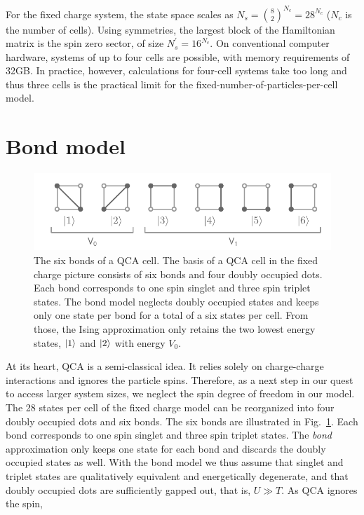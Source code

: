 For the fixed charge system, the state space scales as $N_s =
\binom{8}{2}^{N_c} = 28^{N_c}$ ($N_c$ is the number of cells). Using symmetries,
the largest block of the Hamiltonian matrix is the spin zero sector, of size
$N_s^{\prime} = 16^{N_c}$. On conventional computer hardware, systems of up to
four cells are possible, with memory requirements of 32GB. In practice,
however, calculations for four-cell systems take too long and thus three
cells is the practical limit for the fixed-number-of-particles-per-cell
model.


\section{Bond model}

%
\begin{figure}
  \center
  \includegraphics{bond}
  \caption{
  The six bonds of a QCA cell. The basis of a QCA cell in the fixed charge
  picture consists of six bonds and four doubly occupied dots. Each bond
  corresponds to one spin singlet and three spin triplet states. The bond model
  neglects doubly occupied states and keeps only one state per bond for a total
  of a six states per cell.  From those, the Ising approximation only retains
  the two lowest energy states, $\left|1\right>$ and $\left|2\right>$ with energy $V_0$.
  }
  \label{fig:bond}
\end{figure}
%
At its heart, QCA is a semi-classical idea. It relies solely on charge-charge
interactions and ignores the particle spins. Therefore, as a next step in our
quest to access larger system sizes, we neglect the spin degree of freedom in
our model. The 28 states per cell of the fixed charge model can be
reorganized into four doubly occupied dots and six bonds. The six bonds are
illustrated in Fig.~\ref{fig:bond}. Each bond corresponds to one spin singlet
and three spin triplet states. The \emph{bond} approximation only keeps one
state for each bond and discards the doubly occupied states as well. With the
bond model we thus assume that singlet and triplet states are
qualitatively equivalent and energetically degenerate, and that doubly occupied
dots are sufficiently gapped out, that is, $U \gg T$. As QCA ignores the spin,
